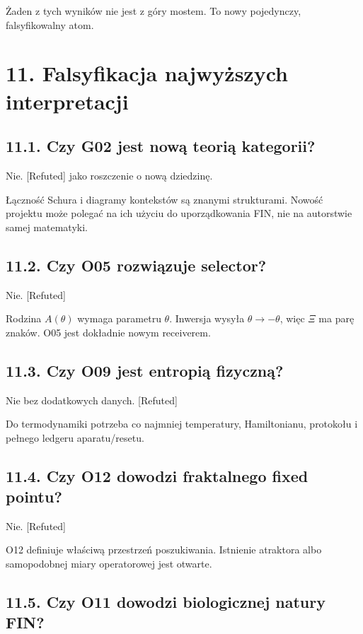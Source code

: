 \documentclass[11pt,a4paper,openany]{report}
\newcommand{\statusRefuted}{\textcolor{finred}{[Refuted]}}
\begin{document}
\.Zaden z tych wyników nie jest z góry mostem. To nowy pojedynczy, falsyfikowalny atom.

\chapter{11. Falsyfikacja najwy\.zszych interpretacji}

\section{11.1. Czy G02 jest nową teorią kategorii?}

Nie. \statusRefuted{} jako roszczenie o nową dziedzinę.

Łączność Schura i diagramy kontekstów są znanymi strukturami. Nowość projektu mo\.ze polegać na ich u\.zyciu do uporządkowania FIN, nie na autorstwie samej matematyki.

\section{11.2. Czy O05 rozwiązuje selector?}

Nie. \statusRefuted{}

Rodzina \(A(\theta)\) wymaga parametru \(\theta\). Inwersja wysyła \(\theta\to-\theta\), więc \(\Xi\) ma parę znaków. O05 jest dokładnie nowym receiverem.

\section{11.3. Czy O09 jest entropią fizyczną?}

Nie bez dodatkowych danych. \statusRefuted{}

Do termodynamiki potrzeba co najmniej temperatury, Hamiltonianu, protokołu i pełnego ledgeru aparatu/\allowbreak{}resetu.

\section{11.4. Czy O12 dowodzi fraktalnego fixed pointu?}

Nie. \statusRefuted{}

O12 definiuje właściwą przestrzeń poszukiwania. Istnienie atraktora albo samopodobnej miary operatorowej jest otwarte.

\section{11.5. Czy O11 dowodzi biologicznej natury FIN?}
\end{document}
